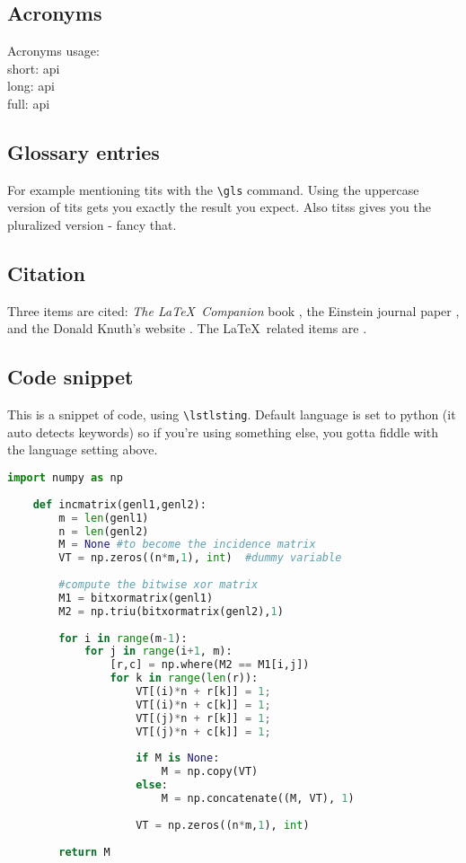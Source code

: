 \documentclass[12pt]{article}
\begin{document}
	\subsection{Acronyms}
	
	Acronyms usage: 
	\\ short: \acrshort{api} 
	\\ long: \acrlong{api}
	\\ full: \acrfull{api}
	
	
	\subsection{Glossary entries}
	
	For example mentioning \gls{tits} with the \texttt{\textbackslash gls} command. Using the uppercase version of \Gls{tits} gets you exactly the result you expect. Also \glspl{tits} gives you the pluralized version - fancy that.

	\subsection{Citation}

	Three items are cited: \textit{The \LaTeX\ Companion} book \cite{latexcompanion}, the Einstein journal paper \cite{einstein}, and the Donald Knuth's website \cite{knuthwebsite}. The \LaTeX\ related items are \cite{latexcompanion,knuthwebsite}.
	\subsection{Code snippet}
	
    This is a snippet of code, using \texttt{\textbackslash lstlsting}. Default language is set to python (it auto detects keywords) so if you're using something else, you gotta fiddle with the language setting above.
    
    \begin{lstlisting}[language=Python]
    import numpy as np
     
    def incmatrix(genl1,genl2):
        m = len(genl1)
        n = len(genl2)
        M = None #to become the incidence matrix
        VT = np.zeros((n*m,1), int)  #dummy variable
     
        #compute the bitwise xor matrix
        M1 = bitxormatrix(genl1)
        M2 = np.triu(bitxormatrix(genl2),1) 
     
        for i in range(m-1):
            for j in range(i+1, m):
                [r,c] = np.where(M2 == M1[i,j])
                for k in range(len(r)):
                    VT[(i)*n + r[k]] = 1;
                    VT[(i)*n + c[k]] = 1;
                    VT[(j)*n + r[k]] = 1;
                    VT[(j)*n + c[k]] = 1;
     
                    if M is None:
                        M = np.copy(VT)
                    else:
                        M = np.concatenate((M, VT), 1)
     
                    VT = np.zeros((n*m,1), int)
     
        return M
    \end{lstlisting}
\end{document}
